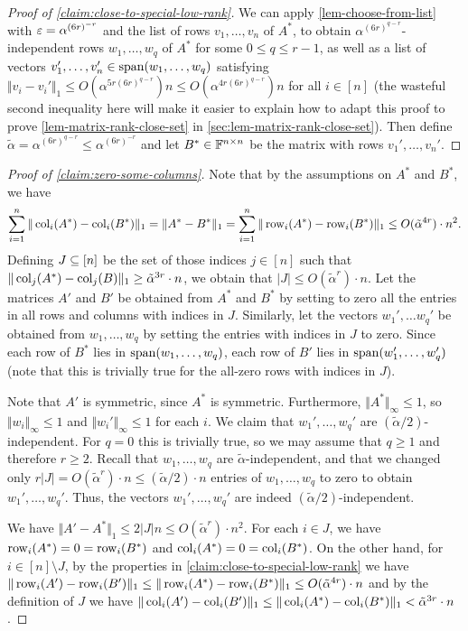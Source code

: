 \documentclass{daj}
\theoremstyle{plain}
\theoremstyle{plain}
\theoremstyle{plain}
\theoremstyle{plain}
\theoremstyle{definition}
\theoremstyle{plain}
\theoremstyle{plain}
\theoremstyle{definition}
\theoremstyle{definition}
\theoremstyle{plain}
\begin{document}
\begin{proof}
[Proof of \cref{claim:close-to-special-low-rank}]
We can apply \cref{lem-choose-from-list} with $\varepsilon=\alpha^{(6r)^{-r}}$ and the list of rows $v_1,\dots,v_n$ of $A^*$, to obtain $\alpha^{(6r)^{q-r}}$-independent rows $w_1,\dots,w_q$ of $A^*$ for some $0\leq q\leq r-1$, as well as a list of vectors $v_1',\dots,v_n'\in \operatorname{span}(w_1,\dots,w_q)$ satisfying $\Vert v_i-v_i'\Vert_1\le O(\alpha^{5r(6r)^{q-r}})n\le O(\alpha^{4r(6r)^{q-r}})n$ for all $i\in [n]$ (the wasteful second inequality here will make it easier to explain how to adapt this proof to prove \cref{lem-matrix-rank-close-set} in \cref{sec:lem-matrix-rank-close-set}). Then define $\tilde\alpha=\alpha^{(6r)^{q-r}}\leq \alpha^{(6r)^{-r}}$ and let $B^*\in \mathbb{F}^{n\times n}$ be the matrix with rows $v_1',\dots,v_n'$.
\end{proof}

\begin{proof}
[Proof of \cref{claim:zero-some-columns}]
Note that by the assumptions on $A^*$ and $B^*$, we have
\[\sum_{i=1}^n \Vert \operatorname{col}_i(A^*)-\operatorname{col}_i(B^*)\Vert_1=\Vert A^*-B^*\Vert_1=\sum_{i=1}^n \Vert \operatorname{row}_i(A^*)-\operatorname{row}_i(B^*)\Vert_1\leq  O(\tilde{\alpha}^{4r})\cdot n^2.\]
Defining $J\subseteq [n]$ be the set of those indices $j\in [n]$ such that $\Vert \operatorname{col}_j(A^*)-\operatorname{col}_j(B)\Vert_1\geq \tilde{\alpha}^{3r}\cdot n$, we obtain that $\vert J\vert\leq O(\tilde \alpha^r)\cdot n$. Let the matrices $A'$ and $B'$ be obtained from $A^*$ and $B^*$ by setting to zero all the entries in all rows and columns with indices in $J$. Similarly, let the vectors $w_1',\dots w_q'$ be obtained from $w_1,\dots,w_q$ by setting the entries with indices in $J$ to zero. Since each row of $B^*$ lies in $\operatorname{span}(w_1,\dots,w_q)$, each row of $B'$ lies in $\operatorname{span}(w_1',\dots,w_q')$ (note that this is trivially true for the all-zero rows with indices in $J$).

Note that $A'$ is symmetric, since $A^*$ is symmetric. Furthermore, $\Vert A^*\Vert_\infty\le 1$, so $\Vert w_i\Vert_\infty\le 1$ and $\Vert w_i'\Vert_\infty\le 1$ for each $i$. We claim that $w_1',\dots,w_q'$ are $(\tilde\alpha/2)$-independent. For $q=0$ this is trivially true, so we may assume that $q\geq 1$ and therefore $r\geq 2$. Recall that $w_1,\dots,w_q$ are $\tilde\alpha$-independent, and that we changed only $r|J|=O(\tilde{\alpha}^{r})\cdot n\le (\tilde\alpha/2)\cdot n$ entries of $w_1,\dots,w_q$ to zero to obtain $w_1',\dots,w_q'$. Thus, the vectors $w_1',\dots,w_q'$ are indeed $(\tilde\alpha/2)$-independent.

We have $\Vert A'-A^*\Vert_1\le 2\vert J\vert n\leq  O(\tilde \alpha^{r})\cdot n^2$. For each $i\in J$, we have $\operatorname{row}_i(A^*)=0=\operatorname{row}_i(B^*)$ and $\operatorname{col}_i(A^*)=0=\operatorname{col}_i(B^*)$. On the other hand, for $i\in [n]\setminus J$, by the properties in \cref{claim:close-to-special-low-rank} we have $\Vert \operatorname{row}_i(A')-\operatorname{row}_i(B')\Vert_1\le \Vert \operatorname{row}_i(A^*)-\operatorname{row}_i(B^*)\Vert_1\le O(\tilde{\alpha}^{4r})\cdot n$  and by the definition of $J$ we have $\Vert \operatorname{col}_i(A')-\operatorname{col}_i(B')\Vert_1\le \Vert \operatorname{col}_i(A^*)-\operatorname{col}_i(B^*)\Vert_1< \tilde{\alpha}^{3r}\cdot n$.
\end{proof}
\end{document}
